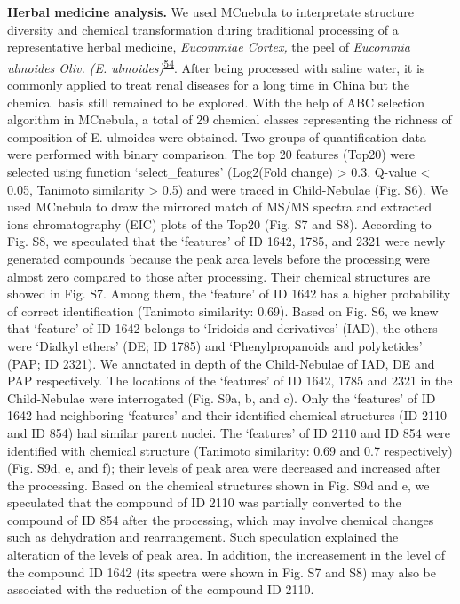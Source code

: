 \documentclass[
]{article}
\begin{document}
\textbf{Herbal medicine analysis.} We used MCnebula to interpretate
structure diversity and chemical transformation during traditional
processing of a representative herbal medicine, \emph{Eucommiae Cortex,}
the peel of \emph{Eucommia ulmoides Oliv. (E.
ulmoides)}\textsuperscript{\protect\hyperlink{ref-2021n}{54}}. After
being processed with saline water, it is commonly applied to treat renal
diseases for a long time in China but the chemical basis still remained
to be explored. With the help of ABC selection algorithm in MCnebula, a
total of 29 chemical classes representing the richness of composition of
E. ulmoides were obtained. Two groups of quantification data were
performed with binary comparison. The top 20 features (Top20) were
selected using function `select\_features' (\textbar Log2(Fold
change)\textbar{} \textgreater{} 0.3, Q-value \textless{} 0.05, Tanimoto
similarity \textgreater{} 0.5) and were traced in Child-Nebulae (Fig.
S6). We used MCnebula to draw the mirrored match of MS/MS spectra and
extracted ions chromatography (EIC) plots of the Top20 (Fig. S7 and S8).
According to Fig. S8, we speculated that the `features' of ID 1642,
1785, and 2321 were newly generated compounds because the peak area
levels before the processing were almost zero compared to those after
processing. Their chemical structures are showed in Fig. S7. Among them,
the `feature' of ID 1642 has a higher probability of correct
identification (Tanimoto similarity: 0.69). Based on Fig. S6, we knew
that `feature' of ID 1642 belongs to `Iridoids and derivatives' (IAD),
the others were `Dialkyl ethers' (DE; ID 1785) and `Phenylpropanoids and
polyketides' (PAP; ID 2321). We annotated in depth of the Child-Nebulae
of IAD, DE and PAP respectively. The locations of the `features' of ID
1642, 1785 and 2321 in the Child-Nebulae were interrogated (Fig. S9a, b,
and c). Only the `features' of ID 1642 had neighboring `features' and
their identified chemical structures (ID 2110 and ID 854) had similar
parent nuclei. The `features' of ID 2110 and ID 854 were identified with
chemical structure (Tanimoto similarity: 0.69 and 0.7 respectively)
(Fig. S9d, e, and f); their levels of peak area were decreased and
increased after the processing. Based on the chemical structures shown
in Fig. S9d and e, we speculated that the compound of ID 2110 was
partially converted to the compound of ID 854 after the processing,
which may involve chemical changes such as dehydration and
rearrangement. Such speculation explained the alteration of the levels
of peak area. In addition, the increasement in the level of the compound
ID 1642 (its spectra were shown in Fig. S7 and S8) may also be
associated with the reduction of the compound ID 2110.
\end{document}

